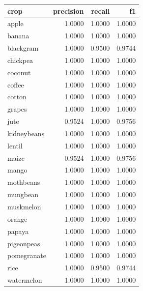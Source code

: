 \begin{tabular}{lrrr}
\toprule
crop & precision & recall & f1 \\
\midrule
apple & 1.0000 & 1.0000 & 1.0000 \\
banana & 1.0000 & 1.0000 & 1.0000 \\
blackgram & 1.0000 & 0.9500 & 0.9744 \\
chickpea & 1.0000 & 1.0000 & 1.0000 \\
coconut & 1.0000 & 1.0000 & 1.0000 \\
coffee & 1.0000 & 1.0000 & 1.0000 \\
cotton & 1.0000 & 1.0000 & 1.0000 \\
grapes & 1.0000 & 1.0000 & 1.0000 \\
jute & 0.9524 & 1.0000 & 0.9756 \\
kidneybeans & 1.0000 & 1.0000 & 1.0000 \\
lentil & 1.0000 & 1.0000 & 1.0000 \\
maize & 0.9524 & 1.0000 & 0.9756 \\
mango & 1.0000 & 1.0000 & 1.0000 \\
mothbeans & 1.0000 & 1.0000 & 1.0000 \\
mungbean & 1.0000 & 1.0000 & 1.0000 \\
muskmelon & 1.0000 & 1.0000 & 1.0000 \\
orange & 1.0000 & 1.0000 & 1.0000 \\
papaya & 1.0000 & 1.0000 & 1.0000 \\
pigeonpeas & 1.0000 & 1.0000 & 1.0000 \\
pomegranate & 1.0000 & 1.0000 & 1.0000 \\
rice & 1.0000 & 0.9500 & 0.9744 \\
watermelon & 1.0000 & 1.0000 & 1.0000 \\
\bottomrule
\end{tabular}
